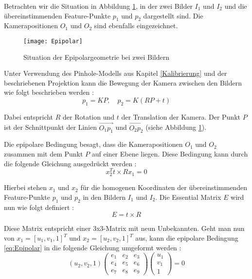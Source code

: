 Betrachten wir die Situation in Abbildung \ref{fig:Epipolar}, in der zwei Bilder \( I_1 \) und \( I_2 \) und die übereinstimmenden Feature-Punkte \( p_1 \) und \( p_2 \) dargestellt sind. Die Kamerapositionen \( O_1 \) und \( O_2 \) sind ebenfalls eingezeichnet. \cite{gao2021vSLAM}

\begin{figure}
    \centering
    \texttt{[image: Epipolar]}
    \caption{Situation der Epipolargeometrie bei zwei Bildern\label{fig:Epipolar}}\par
\end{figure}

Unter Verwendung des Pinhole-Modells aus Kapitel \ref{Kalibrierung} und der beschriebenen Projektion kann die Bewegung der Kamera zwischen den Bildern wie folgt beschrieben werden \cite{gao2021vSLAM}:
\begin{equation}
    p_1 = KP, \quad p_2 = K(RP + t)
\end{equation}

Dabei entspricht \( R \) der Rotation und \( t \) der Translation der Kamera. Der Punkt \( P \) ist der Schnittpunkt der Linien \( \overrightarrow{O_1p_1} \) und \( \overrightarrow{O_2p_2} \) (siehe Abbildung \ref{fig:Epipolar}). \cite{gao2021vSLAM}

Die epipolare Bedingung besagt, dass die Kamerapositionen \( O_1 \) und \( O_2 \) zusammen mit dem Punkt \( P \) auf einer Ebene liegen. Diese Bedingung kann durch die folgende Gleichung ausgedrückt werden \cite{gao2021vSLAM}:
\begin{equation}
    x_2^T t \times R x_1 = 0\label{eq:Epipolar}
\end{equation}

Hierbei stehen \( x_1 \) und \( x_2 \) für die homogenen Koordinaten der übereinstimmenden Feature-Punkte \( p_1 \) und \( p_2 \) in den Bildern \( I_1 \) und \( I_2 \). Die Essential Matrix \( E \) wird nun wie folgt definiert \cite{gao2021vSLAM}:
\begin{equation}
    E = t \times R
\end{equation}

Diese Matrix entspricht einer 3x3-Matrix mit neun Unbekannten. Geht man nun von \( x_1 = [u_1, v_1, 1]^T \) und \( x_2 = [u_2, v_2, 1]^T \) aus, kann die epipolare Bedingung \ref{eq:Epipolar} in die folgende Gleichung umgeformt werden \cite{gao2021vSLAM}:
\begin{equation}
(u_2, v_2, 1) 
\begin{pmatrix}
    e_1 & e_2 & e_3 \\
    e_4 & e_5 & e_6 \\
    e_7 & e_8 & e_9
\end{pmatrix}
\begin{pmatrix}
    u_1 \\ v_1 \\ 1
\end{pmatrix}
= 0
\end{equation}

